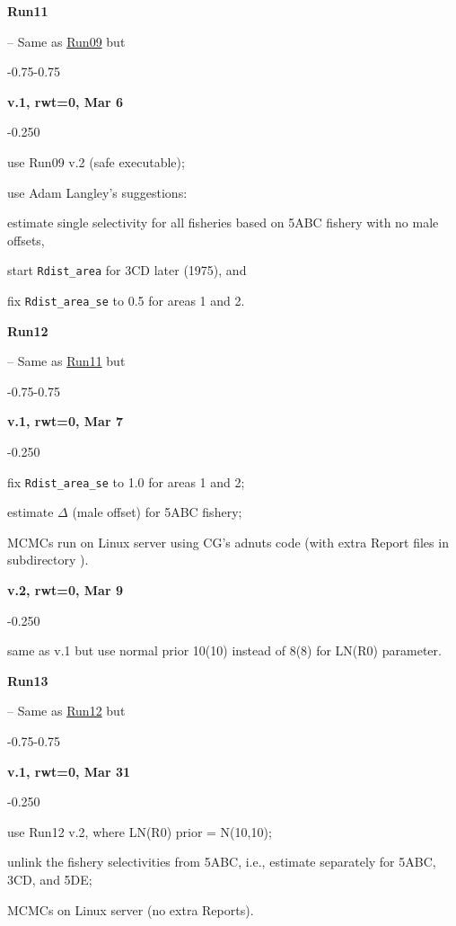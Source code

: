 \hypertarget{R11}{\textbf{Run11}} -- Same as \hyperlink{R09}{Run09} but
\begin{itemize_csas}{-0.75}{-0.75}
	\item \textbf{v.1, rwt=0, Mar 6}
	\begin{itemize_csas}{-0.25}{0}
		\item use Run09 v.2 (safe executable);
		\item use Adam Langley's suggestions:
		\item estimate single selectivity for all fisheries based on 5ABC fishery with no male offsets,
		\item start \texttt{Rdist\_area} for 3CD later (1975), and 
		\item fix \texttt{Rdist\_area\_se} to 0.5 for areas 1 and 2.
	\end{itemize_csas}
\end{itemize_csas}

\hypertarget{R12}{\textbf{Run12}} -- Same as \hyperlink{R11}{Run11} but
\begin{itemize_csas}{-0.75}{-0.75}
	\item \textbf{v.1, rwt=0, Mar 7}
	\begin{itemize_csas}{-0.25}{0}
		\item fix \texttt{Rdist\_area\_se} to 1.0 for areas 1 and 2;
		\item estimate $\Delta$ (male offset) for 5ABC fishery;
		\item MCMCs run on Linux server using CG's adnuts code (with extra Report files in subdirectory ).
	\end{itemize_csas}
	\item \textbf{v.2, rwt=0, Mar 9}
	\begin{itemize_csas}{-0.25}{0}
		\item same as v.1 but use normal prior 10(10) instead of 8(8) for LN(R0) parameter.
	\end{itemize_csas}
\end{itemize_csas}

\hypertarget{R13}{\textbf{Run13}} -- Same as \hyperlink{R12}{Run12} but
\begin{itemize_csas}{-0.75}{-0.75}
	\item \textbf{v.1, rwt=0, Mar 31}
	\begin{itemize_csas}{-0.25}{0}
		\item use Run12 v.2, where LN(R0) prior = N(10,10);
		\item unlink the fishery selectivities from 5ABC, i.e., estimate separately for 5ABC, 3CD, and 5DE;
		\item MCMCs on Linux server (no extra Reports).
	\end{itemize_csas}
\end{itemize_csas}

